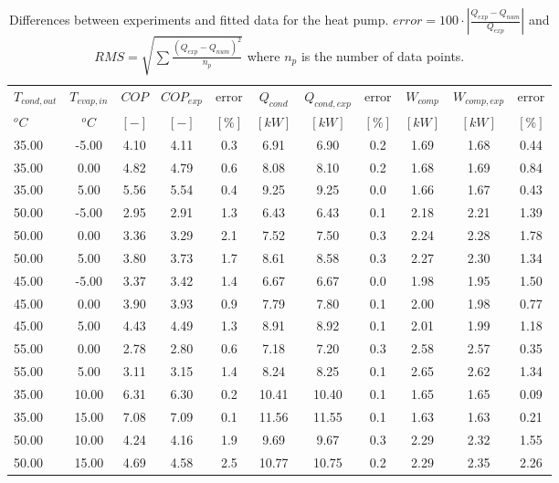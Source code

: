 \documentclass[english]{SPFShortReport}
\begin{document}
\begin{table}[!ht]
\begin{small}
\caption{Differences between experiments and fitted data for the heat pump.          $error=100 \cdot |\frac{Q_{exp}-Q_{num}}{Q_{exp}}|$ and $RMS = \sqrt { \sum{\frac{(Q_{exp}-Q_{num})^2}{n_p}} }$ where $n_p$ is the number of data points.}
\begin{center}
\resizebox{12cm}{!} 
{
\begin{tabular}{l | c c c c c c c c c c } 
\hline
\hline
$T_{cond,out}$ &$T_{evap,in}$ &$COP$ &$COP_{exp}$ &error &$Q_{cond}$ &$Q_{cond,exp}$ &error &$W_{comp}$ &$W_{comp,exp}$ &error \\ 
$^oC$ &$^oC$ &$[-]$ &$[-]$ &$[\%]$ &$[kW]$ &$[kW]$ &$[\%]$ &$[kW]$ &$[kW]$ &$[\%]$\\ 
\hline
35.00  & -5.00 & 4.10 & 4.11 & 0.3 & 6.91 & 6.90 & 0.2 & 1.69 & 1.68 & 0.44\\ 
35.00  & 0.00 & 4.82 & 4.79 & 0.6 & 8.08 & 8.10 & 0.2 & 1.68 & 1.69 & 0.84\\ 
35.00  & 5.00 & 5.56 & 5.54 & 0.4 & 9.25 & 9.25 & 0.0 & 1.66 & 1.67 & 0.43\\ 
50.00  & -5.00 & 2.95 & 2.91 & 1.3 & 6.43 & 6.43 & 0.1 & 2.18 & 2.21 & 1.39\\ 
50.00  & 0.00 & 3.36 & 3.29 & 2.1 & 7.52 & 7.50 & 0.3 & 2.24 & 2.28 & 1.78\\ 
50.00  & 5.00 & 3.80 & 3.73 & 1.7 & 8.61 & 8.58 & 0.3 & 2.27 & 2.30 & 1.34\\ 
45.00  & -5.00 & 3.37 & 3.42 & 1.4 & 6.67 & 6.67 & 0.0 & 1.98 & 1.95 & 1.50\\ 
45.00  & 0.00 & 3.90 & 3.93 & 0.9 & 7.79 & 7.80 & 0.1 & 2.00 & 1.98 & 0.77\\ 
45.00  & 5.00 & 4.43 & 4.49 & 1.3 & 8.91 & 8.92 & 0.1 & 2.01 & 1.99 & 1.18\\ 
55.00  & 0.00 & 2.78 & 2.80 & 0.6 & 7.18 & 7.20 & 0.3 & 2.58 & 2.57 & 0.35\\ 
55.00  & 5.00 & 3.11 & 3.15 & 1.4 & 8.24 & 8.25 & 0.1 & 2.65 & 2.62 & 1.34\\ 
35.00  & 10.00 & 6.31 & 6.30 & 0.2 & 10.41 & 10.40 & 0.1 & 1.65 & 1.65 & 0.09\\ 
35.00  & 15.00 & 7.08 & 7.09 & 0.1 & 11.56 & 11.55 & 0.1 & 1.63 & 1.63 & 0.21\\ 
50.00  & 10.00 & 4.24 & 4.16 & 1.9 & 9.69 & 9.67 & 0.3 & 2.29 & 2.32 & 1.55\\ 
50.00  & 15.00 & 4.69 & 4.58 & 2.5 & 10.77 & 10.75 & 0.2 & 2.29 & 2.35 & 2.26\\ 

\end{tabular}}
\end{center}
\end{small}
\end{table}
\end{document}
